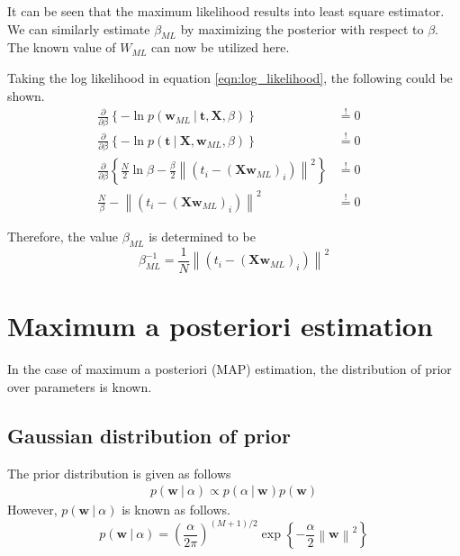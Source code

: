 \documentclass[11pt]{article}
\newcommand\given[1][]{\:#1\vert\:}
\newcommand{\norm}[1]{\left\lVert#1\right\rVert}
\begin{document}
It can be seen that the maximum likelihood results into least square estimator. We can similarly estimate $\beta_{ML}$ by maximizing the posterior with respect to $\beta$. The known value of $W_{ML}$ can now be utilized here.

\newpage
Taking the log likelihood in equation \ref{eqn:log_likelihood}, the following could be shown.
\begin{eqnarray}
    \frac{\partial }{\partial  \beta} \left\{ -\ln{p(\bm{w}_{ML} \given \bm{t}, \bm{X}, \beta)} \right\} 
    &\overset{!}{=} 0& \\
    \frac{\partial }{\partial  \beta} \left\{ -\ln{p(\bm{t} \given \bm{X}, \bm{w}_{ML}, \beta)} \right\} 
    &\overset{!}{=} 0& \\
    \frac{\partial }{\partial \beta} \left\{\frac{N}{2}\ln{\beta} - \frac{\beta}{2} \norm{\left(t_i - (\bm{X}\bm{w}_{ML})_i\right)}^2  \right\}
    &\overset{!}{=} 0& \\
    \frac{N}{\beta} - \norm{\left(t_i - (\bm{X}\bm{w}_{ML})_i\right)}^2
    &\overset{!}{=} 0& 
\end{eqnarray}

Therefore, the value $\beta_{ML}$ is determined to be 
\begin{equation} \label{eqn:beta_ML}
    \beta_{ML}^{-1} = \frac{1}{N}\norm{\left(t_i - (\bm{X}\bm{w}_{ML})_i\right)}^2
\end{equation}

\section{Maximum a posteriori estimation}

In the case of maximum a posteriori (MAP) estimation, the distribution of prior over parameters is known. 

\subsection{Gaussian distribution of prior}

The prior distribution is given as follows
\begin{eqnarray}
    p(\bm{w} \given \alpha) \propto p(\alpha \given \bm{w})p(\bm{w})
\end{eqnarray}
However, $p(\bm{w} \given \alpha)$ is known as follows.
\begin{equation} \label{prior_alpha}
    p(\bm{w} \given \alpha) = \left( \frac{\alpha}{2\pi}\right)^{\left( M+1\right)/2} \exp{\left\{ -\frac{\alpha}{2}\norm{\bm{w}}^2\right\}}
\end{equation}
\end{document}
